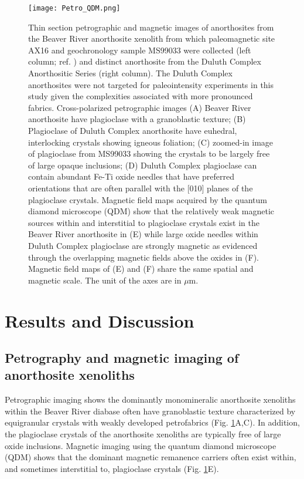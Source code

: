 \documentclass[9pt,twocolumn,twoside,lineno]{pnas-new}
\begin{document}
\begin{figure}
\centering
\noindent\texttt{[image: Petro\_QDM.png]}
\caption{\footnotesize{Thin section petrographic and magnetic images of anorthosites from the Beaver River anorthosite xenolith from which paleomagnetic site AX16 and geochronology sample MS99033 were collected (left column; ref. \citealp{Zhang2021b}) and distinct anorthosite from the Duluth Complex Anorthositic Series (right column). The Duluth Complex anorthosites were not targeted for paleointensity experiments in this study given the complexities associated with more pronounced fabrics. Cross-polarized petrographic images (A) Beaver River anorthosite have plagioclase with a granoblastic texture; (B) Plagioclase of Duluth Complex anorthosite have euhedral, interlocking crystals showing igneous foliation; (C) zoomed-in image of plagioclase from MS99033 showing the crystals to be largely free of large opaque inclusions; (D) Duluth Complex plagioclase can contain abundant Fe-Ti oxide needles that have preferred orientations that are often parallel with the [010] planes of the plagioclase crystals. Magnetic field maps acquired by the quantum diamond microscope (QDM) show that the relatively weak magnetic sources within and interstitial to plagioclase crystals exist in the Beaver River anorthosite in (E) while large oxide needles within Duluth Complex plagioclase are strongly magnetic as evidenced through the overlapping magnetic fields above the oxides in (F). Magnetic field maps of (E) and (F) share the same spatial and magnetic scale. The unit of the axes are in $\mu$m.}}
\label{fig:Petro_QDM}
\end{figure}


\section*{Results and Discussion}

\subsection*{Petrography and magnetic imaging of anorthosite xenoliths}

Petrographic imaging shows the dominantly monomineralic anorthosite xenoliths within the Beaver River diabase often have granoblastic texture characterized by equigranular crystals with weakly developed petrofabrics (Fig. \ref{fig:Petro_QDM}A,C). In addition, the plagioclase crystals of the anorthosite xenoliths are typically free of large oxide inclusions. Magnetic imaging using the quantum diamond microscope (QDM) shows that the dominant magnetic remanence carriers often exist within, and sometimes interstitial to, plagioclase crystals (Fig. \ref{fig:Petro_QDM}E). 
\end{document}
